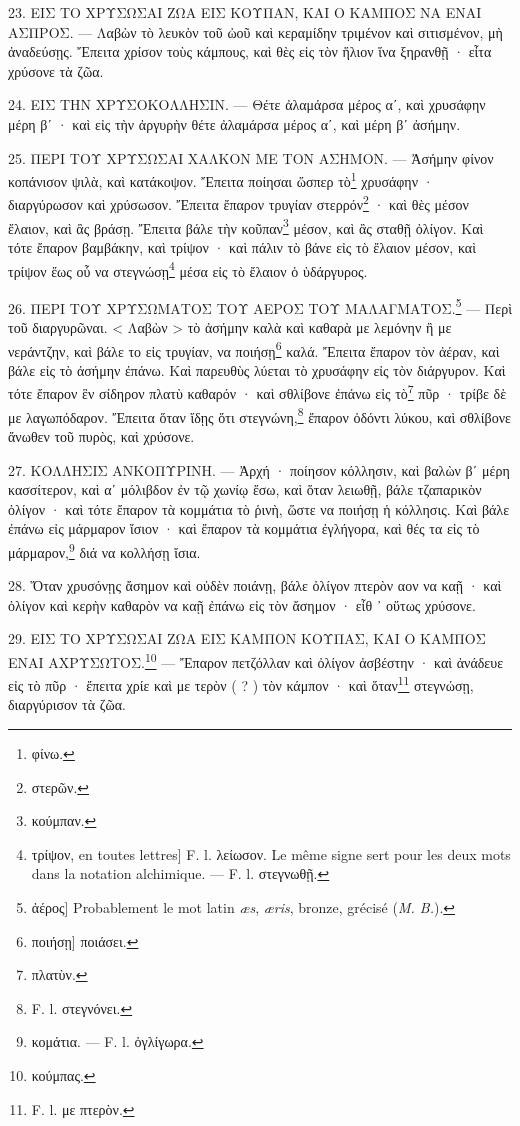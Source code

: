 \documentclass[a4paper, 11pt, oneside, polutonikogreek, french]{article}
\begin{document}
23. ΕΙΣ ΤΟ ΧΡΥΣΩΣΑΙ ΖΩΑ ΕΙΣ ΚΟΥΠΑΝ, ΚΑΙ Ο ΚΑΜΠΟΣ ΝΑ ΕΝΑΙ ΑΣΠΡΟΣ. --- Λαβὼν τὸ λευκὸν τοῦ ὠοῦ καὶ κεραμίδην τριμένον καὶ σιτισμένον, μὴ ἀναδεύσῃς. Ἔπειτα χρίσον τοὺς κάμπους, καὶ θὲς εἰς τὸν ἥλιον ἵνα ξηρανθῇ · εἶτα χρύσονε τὰ ζῶα.

24. ΕΙΣ ΤΗΝ ΧΡΥΣΟΚΟΛΛΗΣΙΝ. --- Θέτε ἀλαμάρσα μέρος αʹ, καὶ χρυσάφην μέρη βʹ · καὶ εἰς τὴν ἀργυρὴν θέτε ἀλαμάρσα μέρος αʹ, καὶ μέρη βʹ ἀσήμην.

25. ΠΕΡΙ ΤΟΥ ΧΡΥΣΩΣΑΙ ΧΑΛΚΟΝ ΜΕ ΤΟΝ ΑΣΗΜΟΝ. --- Ἀσήμην φίνον κοπάνισον ψιλὰ, καὶ κατάκοψον. Ἔπειτα ποίησαι ὥσπερ τὸ\footnote{φίνω.} χρυσάφην · διαργύρωσον καὶ χρύσωσον. Ἔπειτα ἔπαρον τρυγίαν στερρόν\footnote{στερῶν.} · καὶ θὲς μέσον ἔλαιον, καὶ ἂς βράσῃ. Ἔπειτα βάλε τὴν κοῦπαν\footnote{κούμπαν.} μέσον, καὶ ἂς σταθῇ ὀλίγον. Καὶ τότε ἔπαρον βαμβάκην, καὶ τρίψον · καὶ πάλιν τὸ βάνε εἰς τὸ ἔλαιον μέσον, καὶ τρίψον ἕως οὗ να στεγνώσῃ\footnote{τρίψον, en toutes lettres] F. l. λείωσον. Le même signe sert pour les deux mots dans la notation alchimique. --- F. l. στεγνωθῇ.} μέσα εἰς τὸ ἔλαιον ὁ ὑδάργυρος.

26. ΠΕΡΙ ΤΟΥ ΧΡΥΣΩΜΑΤΟΣ ΤΟΥ ΑΕΡΟΣ ΤΟΥ ΜΑΛΑΓΜΑΤΟΣ.\footnote{ἀέρος] Probablement le mot latin \emph{æs}, \emph{æris}, bronze, grécisé (\emph{M. B.}).} --- Περὶ τοῦ διαργυρῶναι. < Λαβὼν > τὸ ἀσήμην καλὰ καὶ καθαρὰ με λεμόνην ἢ με νεράντζην, καὶ βάλε το εἰς τρυγίαν, να ποιήσῃ\footnote{ποιήσῃ] ποιάσει.} καλά. Ἔπειτα ἔπαρον τὸν ἀέραν, καὶ βάλε εἰς τὸ ἀσήμην ἐπάνω. Καὶ παρευθὺς λύεται τὸ χρυσάφην εἰς τὸν διάργυρον. Καὶ τότε ἔπαρον ἓν σίδηρον πλατὺ καθαρόν · καὶ σθλίβονε ἐπάνω εἰς τὸ\footnote{πλατὺν.} πῦρ · τρίβε δὲ με λαγωπόδαρον. Ἔπειτα ὅταν ἴδῃς ὅτι στεγνώνη,\footnote{F. l. στεγνόνει.} ἔπαρον ὀδόντι λύκου, καὶ σθλίβονε ἄνωθεν τοῦ πυρὸς, καὶ χρύσονε.

27. ΚΟΛΛΗΣΙΣ ΑΝΚΟΠΥΡΙΝΗ. --- Ἀρχή · ποίησον κόλλησιν, καὶ βαλὼν βʹ μέρη κασσίτερον, καὶ αʹ μόλιβδον ἐν τῷ χωνίῳ ἔσω, καὶ ὅταν λειωθῇ, βάλε τζαπαρικὸν ὀλίγον · καὶ τότε ἔπαρον τὰ κομμάτια τὸ ῥινὴ, ὥστε να ποιήσῃ ἡ κόλλησις. Καὶ βάλε ἐπάνω εἰς μάρμαρον ἴσιον · καὶ ἔπαρον τὰ κομμάτια ἐγλήγορα, καὶ θές τα εἰς τὸ μάρμαρον,\footnote{κομάτια. --- F. l. ὀγλίγωρα.} διά να κολλήσῃ ἴσια.

28. Ὅταν χρυσόνῃς ἄσημον καὶ οὐδὲν ποιάνῃ, βάλε ὀλίγον πτερὸν αον να καῇ · καὶ ὀλίγον καὶ κερὴν καθαρὸν να καῇ ἐπάνω εἰς τὸν ἄσημον · εἶθ ᾽ οὕτως χρύσονε.

29. ΕΙΣ ΤΟ ΧΡΥΣΩΣΑΙ ΖΩΑ ΕΙΣ ΚΑΜΠΟΝ ΚΟΥΠΑΣ, ΚΑΙ Ο ΚΑΜΠΟΣ ΕΝΑΙ ΑΧΡΥΣΩΤΟΣ.\footnote{κούμπας.} --- Ἔπαρον πετζόλλαν καὶ ὀλίγον ἀσβέστην · καὶ ἀνάδευε εἰς τὸ πῦρ · ἔπειτα χρίε καὶ με τερὸν ( ? ) τὸν κάμπον · καὶ ὅταν\footnote{F. l. με πτερὸν.} στεγνώσῃ, διαργύρισον τὰ ζῶα.
\end{document}

